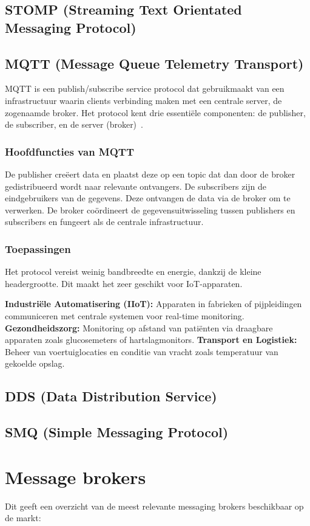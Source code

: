 \subsection{STOMP (Streaming Text Orientated Messaging Protocol)}

\subsection{MQTT (Message Queue Telemetry Transport)}
MQTT is een publish/subscribe service protocol dat gebruikmaakt van een infrastructuur waarin clients verbinding maken met een centrale server, de zogenaamde broker. 
Het protocol kent drie essentiële componenten: de publisher, de subscriber, en de server (broker)~\autocite{Usmani2021}.

\subsubsection{Hoofdfuncties van MQTT}
De publisher creëert data en plaatst deze op een topic dat dan door de broker gedistribueerd wordt naar relevante ontvangers.
De subscribers zijn de eindgebruikers van de gegevens. Deze ontvangen de data via de broker om te verwerken.
De broker coördineert de gegevensuitwisseling tussen publishers en subscribers en fungeert als de centrale infrastructuur.

\subsubsection{Toepassingen}
Het protocol vereist weinig bandbreedte en energie, dankzij de kleine headergrootte. Dit maakt het zeer geschikt voor IoT-apparaten.

\textbf{Industriële Automatisering (IIoT):} Apparaten in fabrieken of pijpleidingen communiceren met centrale systemen voor real-time monitoring.
\textbf{Gezondheidszorg:} Monitoring op afstand van patiënten via draagbare apparaten zoals glucosemeters of hartslagmonitors.
\textbf{Transport en Logistiek:} Beheer van voertuiglocaties en conditie van vracht zoals temperatuur van gekoelde opslag.
 
\subsection{DDS (Data Distribution Service)}

\subsection{SMQ (Simple Messaging Protocol)}

 
\section{Message brokers}
Dit geeft een overzicht van de meest relevante messaging brokers beschikbaar op de markt:

 










